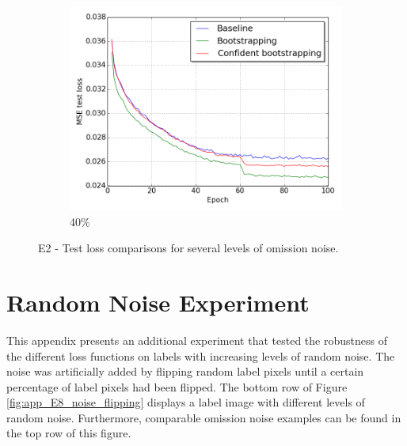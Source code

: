 \begin{figure}[H]
\begin{subfigure}{0.31\textwidth}
\end{subfigure}
\hspace*{\fill} %
\begin{subfigure}{0.31\textwidth}
\includegraphics[width=\textwidth]{figs/E2/lc_4.png}
\caption{40\%} \label{fig:app_E2_4_lc}
\vspace{-0.1cm} %
\end{subfigure}
\vspace{-0.6\baselineskip}
\caption{E2 - Test loss comparisons for several levels of omission noise.} \label{fig:E2_all_lc}
\end{figure}


\section{Random Noise Experiment}
\label{app:randomnoiseexperiment}
This appendix presents an additional experiment that tested the robustness of the different loss functions on labels with increasing levels of random noise. The noise was artificially added by flipping random label pixels until a certain percentage of label pixels had been flipped. The bottom row of Figure \ref{fig:app_E8_noise_flipping} displays a label image with different levels of random noise. Furthermore, comparable omission noise examples can be found in the top row of this figure.\\


